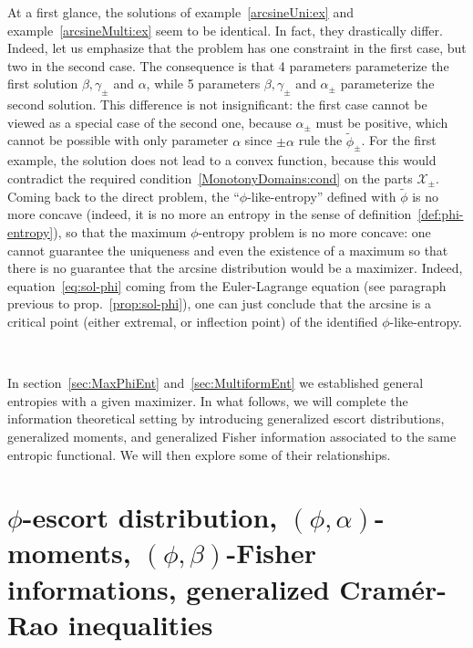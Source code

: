 \documentclass[entropy,article,submit,moreauthors,pdftex]{Definitions/mdpi}
\def\X{\mathcal{X}}%
\begin{document}
At   a  first   glance,   the  solutions   of  example~\ref{arcsineUni:ex}   and
example~\ref{arcsineMulti:ex} seem  to be identical.  In  fact, they drastically
differ.  Indeed,  let us emphasize  that the problem  has one constraint  in the
first case, but  two in the second  case.  The consequence is  that 4 parameters
parameterize  the  first solution  $\beta,  \gamma_\pm$  and $\alpha$,  while  5
parameters  $\beta,   \gamma_\pm$  and  $\alpha_\pm$  parameterize   the  second
solution.  This difference is not insignificant: the first case cannot be viewed
as a  special case  of the  second one, because  $\alpha_\pm$ must  be positive,
which cannot  be possible with only  parameter $\alpha$ since $\pm  \alpha$ rule
the $\widetilde{\phi}_\pm$.  For  the first example, the solution  does not lead
to   a   convex  function,   because   this   would  contradict   the   required
condition~\ref{MonotonyDomains:cond} on  the parts $\X_\pm$. Coming  back to the
direct problem,  the ``$\phi$-like-entropy'' defined with  $\widetilde{\phi}$ is
no  more  concave  (indeed,   it  is  no  more  an  entropy   in  the  sense  of
definition~\ref{def:phi-entropy}), so that the maximum $\phi$-entropy problem is
no more concave: one cannot guarantee the uniqueness and even the existence of a
maximum so that there  is no guarantee that the arcsine  distribution would be a
maximizer.  Indeed,  equation~\eqref{eq:sol-phi} coming from  the Euler-Lagrange
equation  (see paragraph  previous  to prop.~\ref{prop:sol-phi}),  one can  just
conclude that  the arcsine is a  critical point (either extremal,  or inflection
point) of the identified $\phi$-like-entropy.

\

In section~\ref{sec:MaxPhiEnt} and~\ref{sec:MultiformEnt} we established general
entropies  with a  given  maximizer.   In what  follows,  we  will complete  the
information theoretical setting by introducing generalized escort distributions,
generalized moments, and  generalized Fisher information associated  to the same
entropic functional. We will then explore some of their relationships.




\section{$\phi$-escort           distribution,          $(\phi,\alpha)$-moments,
  $(\phi,\beta)$-Fisher informations,  generalized Cram\'er-Rao inequalities}
\label{sec:EscortCR}
\end{document}
